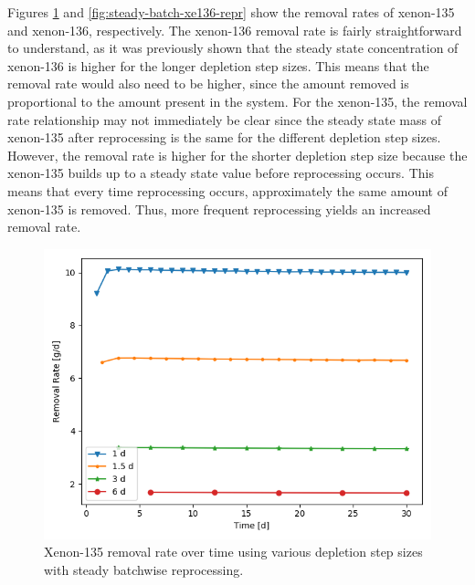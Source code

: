 {Figures \ref{fig:steady-batch-xe135-repr} and \ref{fig:steady-batch-xe136-repr} show the removal rates of xenon-135 and xenon-136, respectively. The xenon-136 removal rate is fairly straightforward to understand, as it was previously shown that the steady state concentration of xenon-136 is higher for the longer depletion step sizes. This means that the removal rate would also need to be higher, since the amount removed is proportional to the amount present in the system. For the xenon-135, the removal rate relationship may not immediately be clear since the steady state mass of xenon-135 after reprocessing is the same for the different depletion step sizes. However, the removal rate is higher for the shorter depletion step size because the xenon-135 builds up to a steady state value before reprocessing occurs. This means that every time reprocessing occurs, approximately the same amount of xenon-135 is removed. Thus, more frequent reprocessing yields an increased removal rate.

\begin{figure}[H]
  \centering
  \includegraphics[scale=0.7]{images/waste_Xe135_6d_sp_comp.png}
  \caption{Xenon-135 removal rate over time using various depletion step sizes with steady batchwise reprocessing.}
   \label{fig:steady-batch-xe135-repr}
\end{figure}

}
